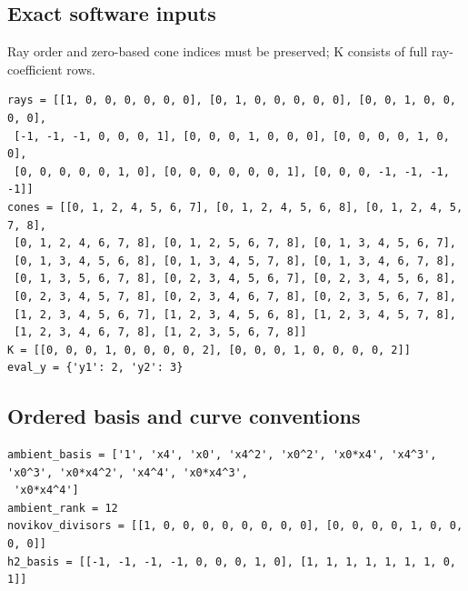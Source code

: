 \documentclass[10pt,a4paper]{article}
\begin{document}
\subsection*{Exact software inputs}
Ray order and zero-based cone indices must be preserved; K consists of full ray-coefficient rows.
\begin{lstlisting}
rays = [[1, 0, 0, 0, 0, 0, 0], [0, 1, 0, 0, 0, 0, 0], [0, 0, 1, 0, 0, 0, 0],
 [-1, -1, -1, 0, 0, 0, 1], [0, 0, 0, 1, 0, 0, 0], [0, 0, 0, 0, 1, 0, 0],
 [0, 0, 0, 0, 0, 1, 0], [0, 0, 0, 0, 0, 0, 1], [0, 0, 0, -1, -1, -1, -1]]
cones = [[0, 1, 2, 4, 5, 6, 7], [0, 1, 2, 4, 5, 6, 8], [0, 1, 2, 4, 5, 7, 8],
 [0, 1, 2, 4, 6, 7, 8], [0, 1, 2, 5, 6, 7, 8], [0, 1, 3, 4, 5, 6, 7],
 [0, 1, 3, 4, 5, 6, 8], [0, 1, 3, 4, 5, 7, 8], [0, 1, 3, 4, 6, 7, 8],
 [0, 1, 3, 5, 6, 7, 8], [0, 2, 3, 4, 5, 6, 7], [0, 2, 3, 4, 5, 6, 8],
 [0, 2, 3, 4, 5, 7, 8], [0, 2, 3, 4, 6, 7, 8], [0, 2, 3, 5, 6, 7, 8],
 [1, 2, 3, 4, 5, 6, 7], [1, 2, 3, 4, 5, 6, 8], [1, 2, 3, 4, 5, 7, 8],
 [1, 2, 3, 4, 6, 7, 8], [1, 2, 3, 5, 6, 7, 8]]
K = [[0, 0, 0, 1, 0, 0, 0, 0, 2], [0, 0, 0, 1, 0, 0, 0, 0, 2]]
eval_y = {'y1': 2, 'y2': 3}
\end{lstlisting}
\subsection*{Ordered basis and curve conventions}
\begin{lstlisting}
ambient_basis = ['1', 'x4', 'x0', 'x4^2', 'x0^2', 'x0*x4', 'x4^3', 'x0^3', 'x0*x4^2', 'x4^4', 'x0*x4^3',
 'x0*x4^4']
ambient_rank = 12
novikov_divisors = [[1, 0, 0, 0, 0, 0, 0, 0, 0], [0, 0, 0, 0, 1, 0, 0, 0, 0]]
h2_basis = [[-1, -1, -1, -1, 0, 0, 0, 1, 0], [1, 1, 1, 1, 1, 1, 1, 0, 1]]
\end{lstlisting}
\end{document}

